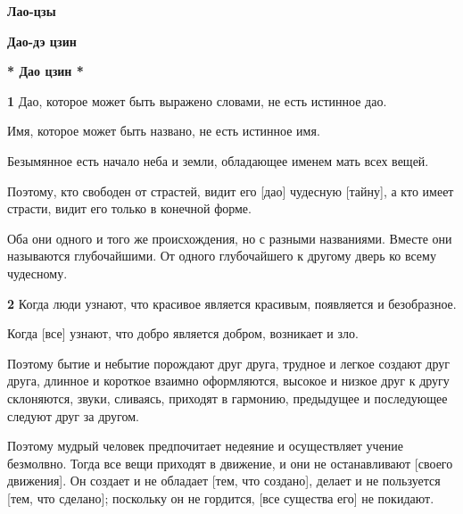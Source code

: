 \documentclass[a4paper]{article}
\title{\textcyrillic{Лао Цзы}}
\begin{document}
\clearpage\setcounter{page}{1}\pagestyle{Standard}

\bigskip

{\centering{}\bfseries
Лао-цзы 
\par}


\bigskip

{\centering{}\bfseries
Дао-дэ цзин
\par}


\bigskip

{\centering{}\ttfamily
\foreignlanguage{russian}{\textrm{\textbf{* Дао цзин *}}}
\par}


\bigskip

{\ttfamily
\foreignlanguage{russian}{\textrm{\textbf{1}}}\foreignlanguage{russian}{\textrm{ Дао, которое может быть выражено
словами, не есть истинное дао.}}}

{
Имя, которое может быть названо, не есть истинное имя.}

{
Безымянное есть начало неба и земли, обладающее именем мать всех вещей.}

{
Поэтому, кто свободен от страстей, видит его [дао] чудесную [тайну], а кто имеет страсти, видит его только в конечной
форме.}

{
Оба они одного и того же происхождения, но с разными названиями. Вместе они называются глубочайшими. От одного
глубочайшего к другому дверь ко всему чудесному.}

{\ttfamily
\foreignlanguage{russian}{\textrm{\textbf{2}}}\foreignlanguage{russian}{\textrm{ Когда люди узнают, что красивое
является красивым, появляется и безобразное.}}}

{
Когда [все] узнают, что добро является добром, возникает и зло.}

{
Поэтому бытие и небытие порождают друг друга, трудное и легкое создают друг друга, длинное и короткое взаимно
оформляются, высокое и низкое друг к другу склоняются, звуки, сливаясь, приходят в гармонию, предыдущее и последующее
следуют друг за другом.}

{
Поэтому мудрый человек предпочитает недеяние и осуществляет учение безмолвно. Тогда все вещи приходят в движение, и они
не останавливают [своего движения]. Он создает и не обладает [тем, что создано], делает и не пользуется [тем, что
сделано]; поскольку он не гордится, [все существа его] не покидают.}
\end{document}
